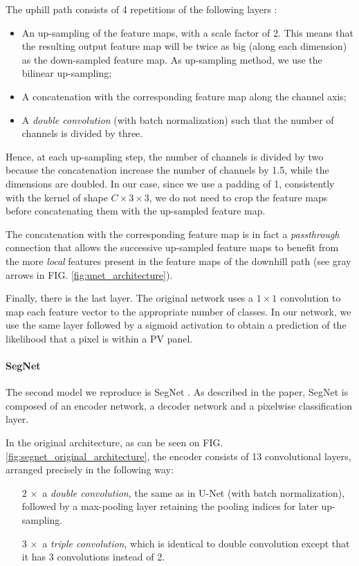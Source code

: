 \documentclass[twocolumn,superscriptaddress,aps,nofootinbib]{revtex4-1}
\begin{document}
The uphill path consists of 4 repetitions of the following layers :
\begin{itemize}
    \item An up-sampling of the feature maps, with a scale factor of 2. This means that the resulting output feature map will be twice as big (along each dimension) as the down-sampled feature map. As up-sampling method, we use the bilinear up-sampling;
    \item A concatenation with the corresponding feature map along the channel axis;
    \item A \emph{double convolution} (with batch normalization) such that the number of channels is divided by three.
\end{itemize}
Hence, at each up-sampling step, the number of channels is divided by two because the concatenation increase the number of channels by \num{1.5}, while the dimensions are doubled.
In our case, since we use a padding of \num{1}, consistently with the kernel of shape $C \times 3 \times 3$, we do not need to crop the feature maps before concatenating them with the up-sampled feature map.

The concatenation with the corresponding feature map is in fact a \emph{passthrough} connection that allows the successive up-sampled feature maps to benefit from the more \emph{local} features present in the feature maps of the downhill path (see gray arrows in FIG. \ref{fig:unet_architecture}).

Finally, there is the last layer. The original network uses a $1 \times 1$ convolution to map each feature vector to the appropriate number of classes. In our network, we use the same layer followed by a sigmoid activation to obtain a prediction of the likelihood that a pixel is within a PV panel.

\vspace{1em}

\paragraph{SegNet}

The second model we reproduce is SegNet \cite{badrinarayanan2017segnet}. As described in the paper, SegNet is composed of an encoder network, a decoder network and a pixelwise classification layer.

In the original architecture, as can be seen on FIG. \ref{fig:segnet_original_architecture}, the encoder consists of 13 convolutional layers, arranged precisely in the following way:
\begin{itemize}
    \item[$2\, \times$] a \emph{double convolution}, the same as in U-Net (with batch normalization), followed by a max-pooling layer retaining the pooling indices for later up-sampling.
    \item[$3\, \times$] a \emph{triple convolution}, which is identical to double convolution except that it has 3 convolutions instead of 2.
\end{itemize}
\end{document}

